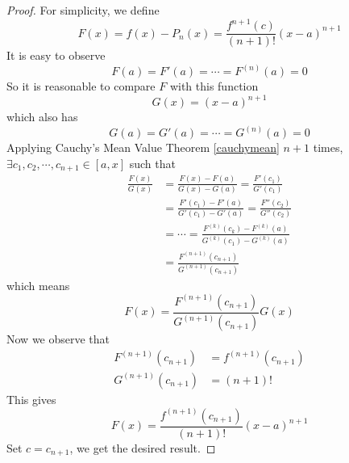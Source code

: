 \begin{proof}
For simplicity, we define
\[ F(x)=f(x)-P_n(x)=\frac{f^{n+1}(c)}{(n+1)!}(x-a)^{n+1} \]
It is easy to observe
\[ F(a)=F'(a)=\cdots=F^{(n)}(a)=0 \]
So it is reasonable to compare $F$ with this function
\[ G(x)=(x-a)^{n+1} \]
which also has
\[ G(a)=G'(a)=\cdots=G^{(n)}(a)=0 \]
Applying Cauchy's Mean Value Theorem \ref{cauchymean} $n+1$ times, \(\exists c_1,c_2,\cdots,c_{n+1}\in[a,x]\) such that
\begin{align*}
	\frac{F(x)}{G(x)}&=\frac{F(x)-F(a)}{G(x)-G(a)}=\frac{F'(c_1)}{G'(c_1)}\\
    &=\frac{F'(c_1)-F'(a)}{G'(c_1)-G'(a)}=\frac{F''(c_2)}{G''(c_2)}\\
    &=\cdots=\frac{F^{(k)}(c_k)-F^{(k)}(a)}{G^{(k)}(c_1)-G^{(k)}(a)}\\
    &=\frac{F^{(n+1)}(c_{n+1})}{G^{(n+1)}(c_{n+1})}
\end{align*}
which means
\[ F(x)= \frac{F^{(n+1)}(c_{n+1})}{G^{(n+1)}(c_{n+1})}G(x) \]
Now we observe that 
\begin{align*}
F^{(n+1)}(c_{n+1})&=f^{(n+1)}(c_{n+1})\\
G^{(n+1)}(c_{n+1})&=(n+1)!
\end{align*}
This gives
\[ F(x)=\frac{f^{(n+1)}(c_{n+1})}{(n+1)!}(x-a)^{n+1} \]
Set \(c=c_{n+1}\), we get the desired result.
\end{proof}

